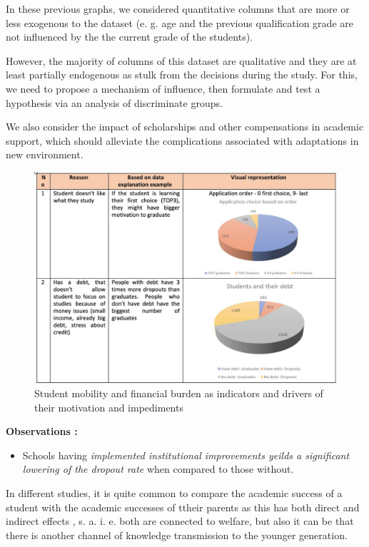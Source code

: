 \documentclass[
  letterpaper,
  DIV=11,
  numbers=noendperiod]{scrartcl}
\providecommand{\tightlist}{%
  \setlength{\itemsep}{0pt}\setlength{\parskip}{0pt}}\usepackage{longtable,booktabs,array}
\begin{document}
In these previous graphs, we considered quantitative columns that are
more or less exogenous to the dataset (e. g. age and the previous
qualification grade are not influenced by the the current grade of the
students).

However, the majority of columns of this dataset are qualitative and
they are at least partially endogenous as stulk from the decisions
during the study. For this, we need to propose a mechanism of influence,
then formulate and test a hypothesis via an analysis of discriminate
groups.

We also consider the impact of scholarships and other compensations in
academic support, which should alleviate the complications associated
with adaptations in new environment.

\begin{figure}

{\centering \includegraphics{./figs/reasons-1.jpg}

}

\caption{Student mobility and financial burden as indicators and drivers
of their motivation and impediments}

\end{figure}

\textbf{Observations :}

\begin{itemize}
\tightlist
\item
  Schools having \emph{implemented institutional improvements yeilds a
  significant lowering of the dropout rate} when compared to those
  without.
\end{itemize}

In different studies, it is quite common to compare the academic success
of a student with the academic successes of ttheir parents as this has
both direct and indirect effects , s. a. i. e. both are connected to
welfare, but also it can be that there is another channel of knowledge
transmission to the younger generation.
\end{document}
